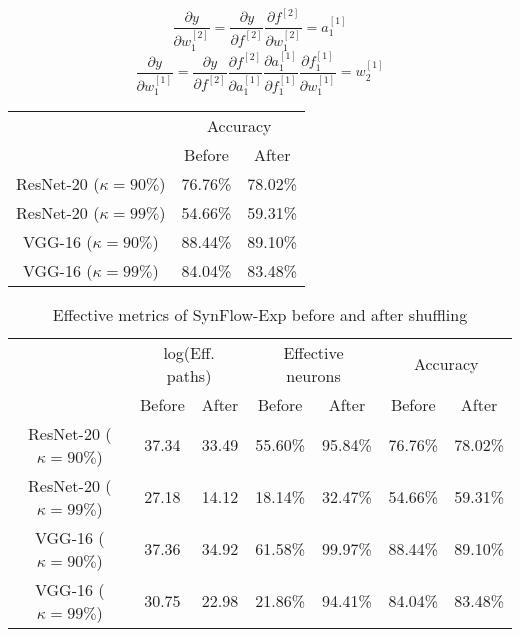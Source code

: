 \newpage
$$\dfrac{\partial y}{\partial w^{[2]}_1} = \dfrac{\partial y}{\partial f^{[2]}} \dfrac{\partial f^{[2]}}{\partial w^{[2]}_1} = a^{[1]}_1$$
$$\dfrac{\partial y}{\partial w^{[1]}_1} = \dfrac{\partial y}{\partial f^{[2]}} \dfrac{\partial f^{[2]}}{\partial a^{[1]}_1} \dfrac{\partial a^{[1]}_1}{\partial f^{[1]}_1} \dfrac{\partial f^{[1]}_1}{\partial w^{[1]}_1} = w^{[1]}_2$$
\begin{table}[]
\centering
\begin{tabular}{|c|cc|}
\hline
\multirow{2}{*}{} & \multicolumn{2}{c|}{Accuracy} \\ \cline{2-3} 
                  & Before        & After         \\ \hline
ResNet-20 ($\kappa=90\%$)        & 76.76\%       & 78.02\%       \\ \hline
ResNet-20 ($\kappa=99\%$)        & 54.66\%       & 59.31\%       \\ \hline
VGG-16 ($\kappa=90\%$)           & 88.44\%       & 89.10\%       \\ \hline
VGG-16 ($\kappa=99\%$)           & 84.04\%       & 83.48\%       \\ \hline
\end{tabular}
\end{table}

\begin{table}[h!]
\centering
\begin{tabular}{|c|cc|cc|cc|}
\hline
\multirow{2}{*}{} & \multicolumn{2}{c|}{log(Eff. paths)} & \multicolumn{2}{c|}{Effective neurons} & \multicolumn{2}{c|}{Accuracy} \\ \cline{2-7} 
                  & Before            & After            & Before             & After             & Before        & After         \\ \hline
ResNet-20 ($\kappa=90\%$)        & 37.34             & 33.49            & 55.60\%     & 95.84\%    & 76.76\%       & 78.02\%       \\ \hline
ResNet-20 ($\kappa=99\%$)        & 27.18             & 14.12            & 18.14\%     & 32.47\%    & 54.66\%       & 59.31\%       \\ \hline
VGG-16 ($\kappa=90\%$)           & 37.36             & 34.92            & 61.58\%     & 99.97\%    & 88.44\%       & 89.10\%       \\ \hline
VGG-16 ($\kappa=99\%$)           & 30.75             & 22.98            & 21.86\%     & 94.41\%    & 84.04\%       & 83.48\%       \\ \hline
\end{tabular}
\caption{Effective metrics of SynFlow-Exp before and after shuffling}
\label{table:sf-exp}
\end{table}
